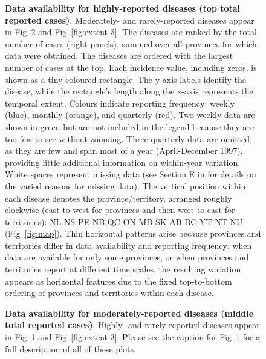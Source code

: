 \documentclass[10pt,letterpaper]{article}
\begin{document}
\begin{figure}[!h]
  \caption{\textbf{Data availability for highly-reported diseases (top \protectby total reported cases)}. Moderately- and rarely-reported diseases appear in Fig~\ref{fig:extent-2} and Fig~\ref{fig:extent-3}. The diseases are ranked by the total number of cases (right panels), summed over all provinces for which data were obtained. The diseases are ordered with the largest number of cases at the top. Each incidence value, including zeros, is shown as a tiny coloured rectangle. The y-axis labels identify the disease, while the rectangle's length along the x-axis represents the temporal extent. Colours indicate reporting frequency: weekly (blue), monthly (orange), and quarterly (red). Two-weekly data are shown in green but are not included in the legend because they are too few to see without zooming. Three-quarterly data are omitted, as they are few and span most of a year (April-December 1997), providing little additional information on within-year variation. White spaces represent missing data (see Section E in  for details on the varied reasons for missing data). The vertical position within each disease denotes the province/territory, arranged roughly clockwise (east-to-west for provinces and then west-to-east for territories): NL-NS-PE-NB-QC-ON-MB-SK-AB-BC-YT-NT-NU (Fig~\ref{fig:map}). Thin horizontal patterns arise because provinces and territories differ in data availability and reporting frequency: when data are available for only some provinces, or when provinces and territories report at different time scales, the resulting variation appears as horizontal features due to the fixed top-to-bottom ordering of provinces and territories within each disease.}
  \label{fig:extent-1}
\end{figure}

\newpage



\newpage

\begin{figure}[!h]
  \caption{\textbf{Data availability for moderately-reported diseases (middle \protectby total reported cases)}. Highly- and rarely-reported diseases appear in Fig~\ref{fig:extent-1} and Fig~\ref{fig:extent-3}. Please see the caption for Fig~\ref{fig:extent-1} for a full description of all of these plots.}
  \label{fig:extent-2}
\end{figure}

\newpage
\end{document}
